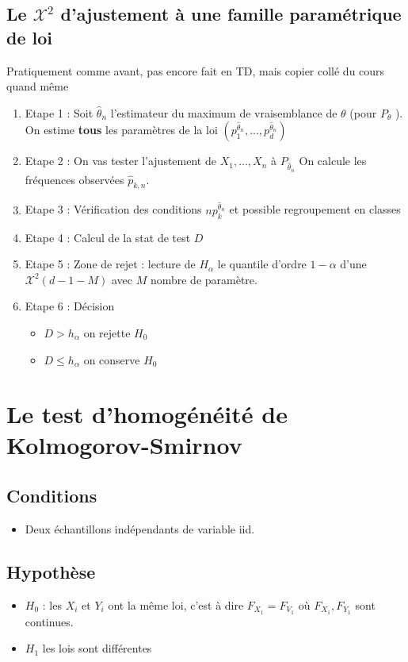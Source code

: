 \documentclass{article}
\theoremstyle{plain}%
\theoremstyle{definition}
\theoremstyle{remark}
\begin{document}
\subsection{Le $ \mathcal{X}^2 $ d'ajustement à une famille paramétrique de loi}
Pratiquement comme avant, pas encore fait en TD, mais copier collé du cours quand même 
\begin{enumerate}
    \item Etape 1 : Soit $ \hat{\theta }_n $ l'estimateur du maximum de vraisemblance de $ \theta  $ (pour $ P_\theta  $ ). On estime \textbf{tous} les paramètres de la loi $ (p_1^{\hat{\theta }_n}, \dots, p_d^{\hat{\theta }_n}) $ 
    \item Etape 2 : On vas tester l'ajustement de $ X_1, \dots, X_n $ à $ P_{\hat{\theta }_n} $ On calcule les fréquences observées $ \hat{p}_{k,n} $.
    \item Etape 3 : Vérification des conditions $ np_k^{\hat{\theta }_n} $ et possible regroupement en classes 
    \item Etape 4 : Calcul de la stat de test $ D $ 
    \item Etape 5 : Zone de rejet : lecture de $ H_\alpha  $ le quantile d'ordre $ 1-\alpha  $ d'une $ \mathcal{X}^2(d-1-M) $ avec $ M $ nombre de paramètre. 
    \item Etape 6 : Décision 
        \begin{itemize}
            \item $ D > h_\alpha  $ on rejette $ H_0 $ 
            \item $ D \leq h_\alpha  $ on conserve $ H_0 $ 
        \end{itemize}
\end{enumerate}


\section{Le test d'homogénéité de Kolmogorov-Smirnov}
\subsection*{Conditions}
\begin{itemize}
    \item Deux échantillons indépendants de variable iid.
\end{itemize}

\subsection*{Hypothèse}
\begin{itemize}
    \item $ H_0 $ : les $ X_i $ et $ Y_i $ ont la même loi, c'est à dire $ F_{X_1} = F_{V_1} $ où $ F_{X_1}, F_{Y_1} $ sont continues.
    \item $ H_1 $ les lois sont différentes
\end{itemize}
\end{document}
